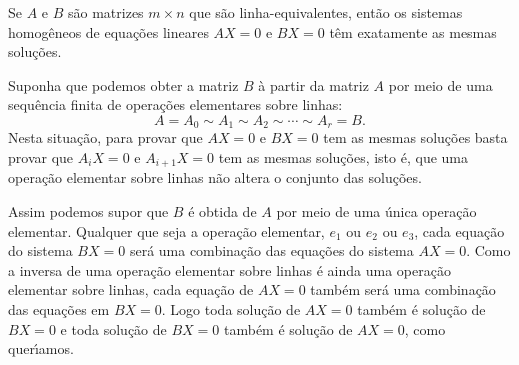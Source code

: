 \begin{teorema}
Se $A$ e $B$ s\~ao matrizes $m \times n$ que s\~ao linha-equivalentes, ent\~ao os sistemas homog\^eneos de equa\c{c}\~oes lineares $AX = 0$ e $BX = 0$ t\^em exatamente as mesmas solu\c{c}\~oes.
\end{teorema}
\begin{prova}
Suponha que podemos obter a matriz $B$ \`a partir da matriz $A$ por meio de uma sequ\^encia finita de opera\c{c}\~oes elementares sobre linhas:
\[
A = A_0 \sim A_1 \sim A_2 \sim \cdots \sim A_r = B.
\]
Nesta situa\c{c}\~ao, para provar que $AX = 0$ e $BX = 0$ tem as mesmas solu\c{c}\~oes basta provar que $A_iX = 0$ e $A_{i + 1}X = 0$ tem as mesmas solu\c{c}\~oes, isto \'e, que uma opera\c{c}\~ao elementar sobre linhas n\~ao altera o conjunto das solu\c{c}\~oes.

Assim podemos supor que $B$ \'e obtida de $A$ por meio de uma \'unica opera\c{c}\~ao elementar. Qualquer que seja a opera\c{c}\~ao elementar, $e_1$ ou $e_2$ ou $e_3$, cada equa\c{c}\~ao do sistema $BX = 0$ ser\'a uma combina\c{c}\~ao das equa\c{c}\~oes do sistema $AX = 0$. Como a inversa de uma opera\c{c}\~ao elementar sobre linhas \'e ainda uma opera\c{c}\~ao elementar sobre linhas, cada equa\c{c}\~ao de $AX = 0$ tamb\'em ser\'a uma combina\c{c}\~ao das equa\c{c}\~oes em $BX = 0$. Logo toda solu\c{c}\~ao de $AX = 0$ tamb\'em \'e solu\c{c}\~ao de $BX = 0$ e toda solu\c{c}\~ao de $BX = 0$ tamb\'em \'e solu\c{c}\~ao de $AX = 0$, como quer{\'\i}amos.
\end{prova}

